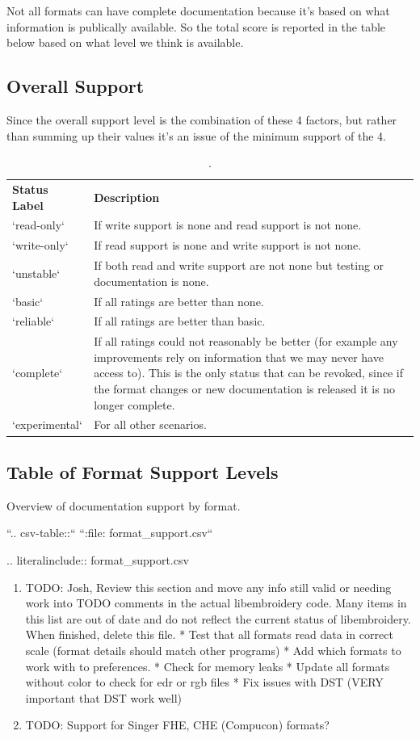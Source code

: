 \documentclass[10pt]{report}
\begin{document}
Not all formats can have complete documentation because it's based on what
information is publically available. So the total score is reported in the table
below based on what level we think is available.

\subsection{Overall Support}

Since the overall support level is the combination of these
4 factors, but rather than summing up their values it's an
issue of the minimum support of the 4.

\begin{table}
\begin{tabular}{l l}
\textbf{Status Label} &
\textbf{Description}
\\
`read-only` &
If write support is none and read support is not none.
\\
`write-only` &
If read support is none and write support is not none.
\\
`unstable` &
If both read and write support are not none but testing or documentation is none.
\\
`basic` &
If all ratings are better than none.
\\
`reliable` &
If all ratings are better than basic.
\\
`complete` &
If all ratings could not reasonably be better (for example any improvements
rely on information that we may never have access to). This is the only status
that can be revoked, since if the format changes or new documentation is
released it is no longer complete.
\\
`experimental` &
For all other scenarios.
\end{tabular}
\caption{.}
\end{table}

\subsection{Table of Format Support Levels}

Overview of documentation support by format.

``.. csv-table::``
``:file: format\_support.csv``

.. literalinclude:: format\_support.csv

\begin{enumerate}
\item TODO: Josh, Review this section and move any info still valid or needing work into TODO comments in the actual libembroidery code. Many items in this list are out of date and do not reflect the current status of libembroidery. When finished, delete this file.
  * Test that all formats read data in correct scale (format details should match other programs)
  * Add which formats to work with to preferences.
  * Check for memory leaks
  * Update all formats without color to check for edr or rgb files
  * Fix issues with DST (VERY important that DST work well)
\item TODO: Support for Singer FHE, CHE (Compucon) formats?
\end{enumerate}
\end{document}
